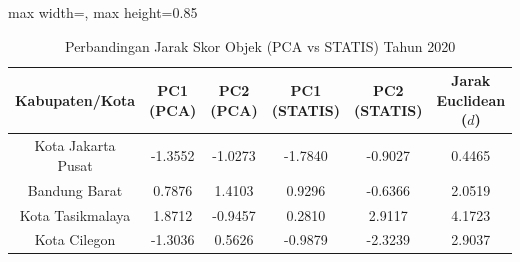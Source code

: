 \begin{table}[H]
\centering
\caption{Perbandingan Jarak Skor Objek (PCA vs STATIS) Tahun 2020} \label{tab:sample1jarak_skor_2020}
\begin{adjustbox}{max width=\textwidth, max height=0.85\textheight}
\begin{tabular}{|c|c|c|c|c|c|}
\hline
\textbf{Kabupaten/Kota} & \textbf{PC1 (PCA)} & \textbf{PC2 (PCA)} & \textbf{PC1 (STATIS)} & \textbf{PC2 (STATIS)} & \textbf{Jarak Euclidean ($d$)} \\
\hline
Kota Jakarta Pusat & -1.3552 & -1.0273 & -1.7840 & -0.9027 & 0.4465 \\
Bandung Barat & 0.7876 & 1.4103 & 0.9296 & -0.6366 & 2.0519 \\
Kota Tasikmalaya & 1.8712 & -0.9457 & 0.2810 & 2.9117 & 4.1723 \\
Kota Cilegon & -1.3036 & 0.5626 & -0.9879 & -2.3239 & 2.9037 \\
\hline
\end{tabular}
\end{adjustbox}
\end{table}